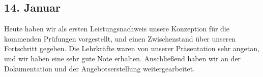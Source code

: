 \subsection{14. Januar}
Heute haben wir als ersten Leistungsnachweis unsere Konzeption für die kommenden Prüfungen vorgestellt, und einen Zwischenstand über unseren Fortschritt gegeben. Die Lehrkräfte waren von unserer Präsentation sehr angetan, und wir haben eine sehr gute Note erhalten. Anschließend haben wir an der Dokumentation und der Angebotserstellung weitergearbeitet.